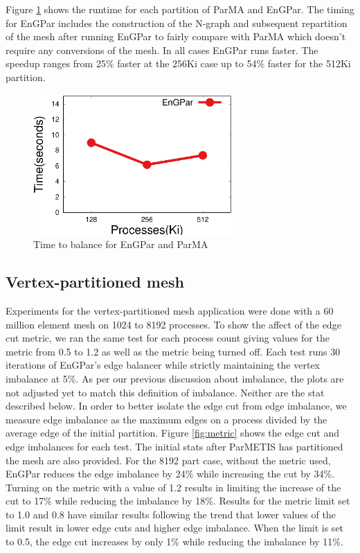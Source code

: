 \documentclass[conference]{IEEEtran}
\begin{document}
Figure \ref{fig:fem_time} shows the runtime for each partition of ParMA and EnGPar. The
timing for EnGPar includes the construction of the N-graph and subsequent repartition of
the mesh after running EnGPar to fairly compare with ParMA which doesn't require any
conversions of the mesh. In all cases EnGPar runs faster. The speedup ranges from
25\% faster at the 256Ki case up to 54\% faster for the 512Ki partition.

\begin{figure}[!ht]
  \centering
  \includegraphics[width=3in]{plots/mira_fem_results/time_v_cores}
  \caption{Time to balance for EnGPar and ParMA}
  \label{fig:fem_time}
\end{figure}

\subsection {Vertex-partitioned mesh}
Experiments for the vertex-partitioned mesh application were done with a 60 million
element mesh on 1024 to 8192 processes. To show the affect of the edge cut
metric, we ran the same test for each process count giving values for the metric
from 0.5 to 1.2 as well as the metric being turned off. Each test runs 30 iterations
of EnGPar's edge balancer while strictly maintaining the vertex imbalance at 5\%.
{\color{red} As per our previous discussion about imbalance, the plots are not adjusted yet to
  match this definition of imbalance. Neither are the stat described below.}
In order to better isolate the edge cut from edge imbalance, we measure edge imbalance as the
maximum edges on a process divided by the average edge of the initial partition.
Figure \ref{fig:metric} shows the edge cut and edge imbalances for each
test. The initial stats after ParMETIS has partitioned the mesh are also provided. For the
8192 part case, without
the metric used, EnGPar reduces the edge imbalance by 24\% while increasing the cut by
34\%. Turning on the metric with a value of 1.2 results in limiting the increase of the cut to
17\% while reducing the imbalance by 18\%. Results for the metric limit set to 1.0
and 0.8 have similar results following the trend that lower values of the limit result
in lower edge cuts and higher edge imbalance. When the limit is set to 0.5, the edge cut
increases by only 1\% while reducing the imbalance by 11\%.
\end{document}
